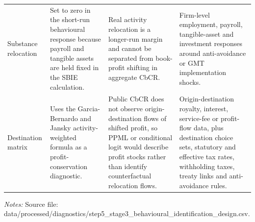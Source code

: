 \begin{table}[H]
\begin{adjustbox}{max width=\textwidth,center}
\begin{tabular}{@{}L{2.7cm}L{4.1cm}L{3.7cm}L{5.1cm}@{}}
Substance relocation & Set to zero in the short-run behavioural response because payroll and tangible assets are held fixed in the SBIE calculation. & Real activity relocation is a longer-run margin and cannot be separated from book-profit shifting in aggregate CbCR. & Firm-level employment, payroll, tangible-asset and investment responses around anti-avoidance or GMT implementation shocks. \\
Destination matrix & Uses the Garcia-Bernardo and Jansky activity-weighted formula as a profit-conservation diagnostic. & Public CbCR does not observe origin-destination flows of shifted profit, so PPML or conditional logit would describe profit stocks rather than identify counterfactual relocation flows. & Origin-destination royalty, interest, service-fee or profit-flow data, plus destination choice sets, statutory and effective tax rates, withholding taxes, treaty links and anti-avoidance rules. \\
\bottomrule
\end{tabular}
\end{adjustbox}

\vspace{0.5em}
\begin{minipage}{0.96\textwidth}
\footnotesize\raggedright \textit{Notes:} Source file: data/processed/diagnostics/step5\_stage3\_behavioural\_identification\_design.csv.
\end{minipage}
\end{table}
